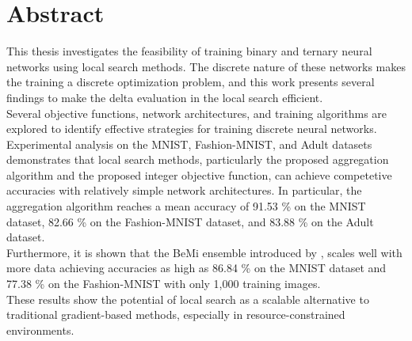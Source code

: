 \section*{Abstract}
This thesis investigates the feasibility of training binary and ternary neural networks using local search methods. The discrete nature of these networks makes the training a discrete optimization problem, and this work presents several findings to make the delta evaluation in the local search efficient. \\

\noindent Several objective functions, network architectures, and training algorithms are explored to identify effective strategies for training discrete neural networks. Experimental analysis on the MNIST, Fashion-MNIST, and Adult datasets demonstrates that local search methods, particularly the proposed aggregation algorithm and the proposed integer objective function, can achieve competetive accuracies with relatively simple network architectures. In particular, the aggregation algorithm reaches a mean accuracy of 91.53 \% on the MNIST dataset, 82.66 \% on the Fashion-MNIST dataset, and 83.88 \% on the Adult dataset.  \\

\noindent Furthermore, it is shown that the BeMi ensemble introduced by \cite{ambrogio2023}, scales well with more data achieving accuracies as high as 86.84 \% on the MNIST dataset and 77.38 \% on the Fashion-MNIST with only 1,000 training images. \\

\noindent These results show the potential of local search as a scalable alternative to traditional gradient-based methods, especially in resource-constrained environments.
\newpage 